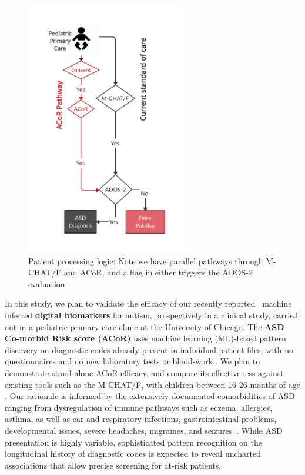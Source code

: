\documentclass[onecolumn, compsoc,11pt]{IEEEtran}
\renewcommand{\captionN}[1]{\caption{\color{CadetBlue4!80!black} \sffamily \fontsize{9}{10}\selectfont #1  }}
\def\acor{ACoR\xspace}
\begin{document}
\begin{figure}
  \vspace{-40pt}
  
  \hspace{-10pt}\includegraphics[width=2.75in]{Figures/flowx}
  \vspace{-30pt}
  
  \captionN{Patient processing logic: Note we have parallel pathways through M-CHAT/F and \acor, and
  a flag in either triggers the ADOS-2 evaluation.}\label{figflow}
\end{figure}%
%
In this study, we plan to validate the efficacy of our recently reported~\cite{Onishchenko_2021}  machine inferred \textbf{digital biomarkers} for autism, prospectively in a  clinical study, carried out in a
pediatric primary care clinic at the University of Chicago. The \textbf{ ASD Co-morbid Risk score (\acor)} uses machine learning (ML)-based pattern discovery on diagnostic codes already present in individual patient files, with no questionnaires and no new laboratory tests or blood-work.. We plan to demonstrate stand-alone \acor efficacy, and compare its effectiveness against existing  tools such as the M-CHAT/F, with children between 16-26 months of age . Our rationale is informed by the extensively documented comorbidities of ASD ranging from dysregulation of immune pathways such as eczema, allergies, asthma, as well as ear and respiratory infections, gastrointestinal problems, developmental issues, severe headaches, migraines, and seizures~\cite{pmid30733689,pmid22511918}. While ASD presentation is highly variable, sophisticated pattern recognition on the longitudinal history of  diagnostic codes is expected to reveal uncharted associations that allow precise screening for at-risk patients.
\end{document}
